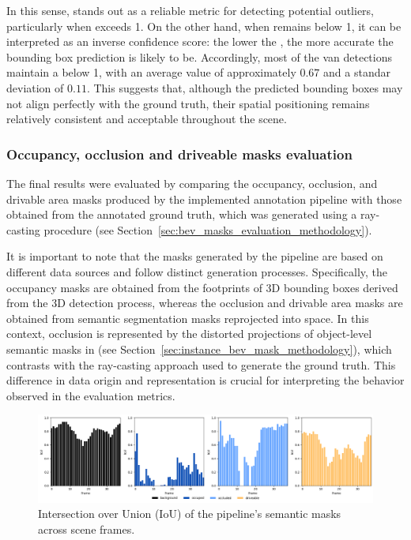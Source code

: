 In this sense,  stands out as a reliable metric for detecting potential outliers, particularly when  exceeds 1. On the other hand, when  remains below 1, it can be interpreted as an inverse confidence score: the lower the , the more accurate the bounding box prediction is likely to be. Accordingly, most of the van detections maintain a  below 1, with an average value of approximately $0.67$ and a standar deviation of $0.11$. This suggests that, although the predicted bounding boxes may not align perfectly with the ground truth, their spatial positioning remains relatively consistent and acceptable throughout the scene.

\subsubsection{Occupancy, occlusion and driveable masks evaluation}
The final results were evaluated by comparing the occupancy, occlusion, and drivable area masks produced by the implemented annotation pipeline with those obtained from the annotated ground truth, which was generated using a ray-casting procedure (see Section~\ref{sec:bev_masks_evaluation_methodology}).

It is important to note that the masks generated by the pipeline are based on different data sources and follow distinct generation processes. Specifically, the occupancy masks are obtained from the footprints of 3D bounding boxes derived from the 3D detection process, whereas the occlusion and drivable area masks are obtained from semantic segmentation masks reprojected into  space. In this context, occlusion is represented by the distorted projections of object-level semantic masks in  (see Section~\ref{sec:instance_bev_mask_methodology}), which contrasts with the ray-casting approach used to generate the ground truth. This difference in data origin and representation is crucial for interpreting the behavior observed in the evaluation metrics.

\begin{figure}[!ht]
    \centering
    \includegraphics[width=\linewidth]{./images/experiments/iou_occ2_masks.png}
    \caption{Intersection over Union (IoU) of the pipeline's semantic masks across scene frames.}
    \label{fig:scene_iou_occ2_masks}
\end{figure}

